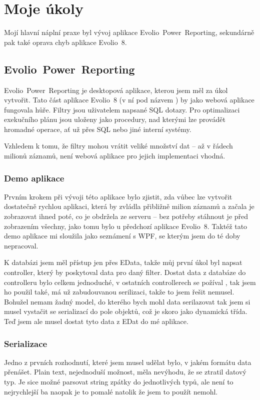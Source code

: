 \documentclass[czech,bachelor,dept460,male,csharp]{diploma}
\newcommand{\EvolioEight}{Evolio~8}
\newcommand{\EFilters}{Evolio~Power~Reporting}
\newcommand{\EData}{EData}
\begin{document}
\section{Moje úkoly}
	Mojí hlavní náplní praxe byl vývoj aplikace {\EFilters}, sekundárně pak také oprava chyb aplikace {\EvolioEight}.
	\subsection{\EFilters}
		{\EFilters} je desktopová aplikace, kterou jsem měl za úkol vytvořit. Tato část aplikace {\EvolioEight} (v ní pod názvem ) by jako webová aplikace fungovala hůře.
		Filtry jsou uživatelem napsané SQL dotazy. Pro optimalizaci exekučního plánu jsou uloženy jako procedury, nad kterými lze provádět hromadné operace, ať už přes SQL nebo jiné interní systémy.
		
		Vzhledem k tomu, že filtry mohou vrátit veliké množství dat – až v řádech milionů záznamů, není webová aplikace pro jejich implementaci vhodná.
		\subsubsection{Demo aplikace}
			Prvním krokem při vývoji této aplikace bylo zjistit, zda vůbec lze vytvořit dostatečně rychlou aplikaci, která by zvládla přibližně milion záznamů a začala je zobrazovat ihned poté, co je obdržela ze serveru – bez potřeby stáhnout je před zobrazením všechny, jako tomu bylo u předchozí aplikace {\EvolioEight}.
			Taktéž tato demo aplikace mi sloužila jako seznámení s WPF, se kterým jsem do té doby nepracoval.
			
			K databázi jsem měl přístup jen přes {\EData}, takže můj první úkol byl napsat controller, který by poskytoval data pro daný filter. Dostat data z databáze do controlleru bylo celkem jednoduché, v ostatních controllerech se požíval , tak jsem ho použil také, má už zabudouvanou serilizaci, takže to jsem řešit nemusel. Bohužel nemam žadný model, do kterého bych mohl data serilazovat tak jsem si musel vystačit se serializací do pole objektů, což je skoro jako dynamická třída. Teď jsem ale musel dostat tyto data z EDat do mé aplikace.
		\subsubsection{Serializace}
			Jedno z prvních rozhodnutí, které jsem musel udělat bylo, v jakém formátu data přenášet. Plain text, nejednoduší možnost, měla nevýhodu, že se ztratil datový typ. Je sice možné parsovat string zpátky do jednotlivých typů, ale není to nejrychlejší ba naopak je to pomalé natolik že jsem to použít nemohl.
			
\end{document}
